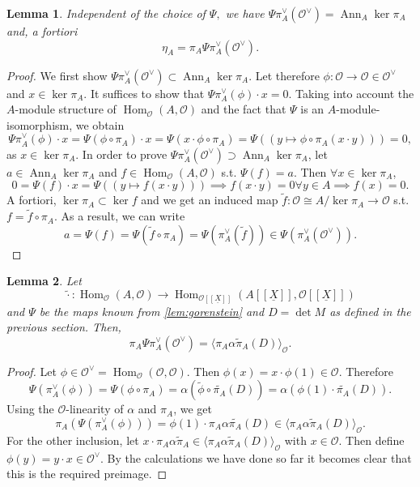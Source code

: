 \documentclass{article}
\theoremstyle{plain}%
\newtheorem{lemma}{Lemma}[section]
\theoremstyle{definition}
\theoremstyle{remark}
\newcommand{\ann}{\operatorname{Ann}}
\renewcommand{\hom}{\operatorname{Hom}}
\begin{document}
\begin{lemma}
    Independent of the choice of \(\Psi,\) we have 
    \(\Psi \pi_A^\vee(\mathcal{O}^\vee) = \ann_A \ker \pi_A\) and, a fortiori
    \[
        \eta_A = \pi_A \Psi \pi_A^\vee(\mathcal{O}^\vee).  
    \]
\end{lemma}
\begin{proof}
    We first show \(\Psi \pi_A^\vee(\mathcal{O}^\vee) \subset \ann_A \ker \pi_A\).
    Let therefore \(\phi\colon \mathcal{O} \to \mathcal{O} \in \mathcal{O}^\vee\) and \(x \in \ker \pi_A\).
    It suffices to show that \(\Psi \pi_A^\vee(\phi) \cdot x = 0\).
    Taking into account the \(A\)-module structure of \(\hom_\mathcal{O}(A, \mathcal{O})\) 
    and the fact that \(\Psi\) is an \(A\)-module-isomorphism, we obtain
    \[
        \Psi \pi_A^\vee(\phi) \cdot x = \Psi(\phi \circ \pi_A) \cdot x = \Psi(x \cdot \phi \circ \pi_A) 
        = \Psi((y \mapsto \phi \circ \pi_A(x\cdot y))) = 0,
    \]
    as \(x \in \ker \pi_A\).
    In order to prove  \(\Psi \pi_A^\vee(\mathcal{O}^\vee) \supset \ann_A \ker \pi_A\), let \(a \in \ann_A \ker \pi_A\)
    and \(f \in \hom_\mathcal{O}(A, \mathcal{O})\) s.t. \(\Psi(f) = a\). Then \(\forall x \in \ker \pi_A\),
    \[
        0 = \Psi(f) \cdot x = \Psi((y \mapsto f(x\cdot y))) \implies f(x\cdot y) = 0 \forall y \in A \implies f(x) = 0.
    \]
    A fortiori, \(\ker \pi_A \subset \ker f\) and we get an induced map \(\tilde f\colon \mathcal{O} \cong A/\ker \pi_A \to \mathcal{O}\)
    s.t. \(f = \tilde f \circ \pi_A\). As a result, we can write
    \[
        a = \Psi(f) = \Psi(\tilde f \circ \pi_A) = \Psi(\pi_A^\vee(\tilde f)) \in \Psi(\pi_A^\vee(\mathcal{O}^\vee)).  
    \]
\end{proof}

\begin{lemma}
    Let 
    \[
        \!\tilde{\cdot}\colon \hom_\mathcal{O}(A, \mathcal{O}) \to 
        \hom_{\mathcal{O}[[\underline{X}]]}(A[[\underline{X}]], \mathcal{O}[[\underline{X}]])
    \]
    and \(\Psi\)
    be the maps known from \cref{lem:gorenstein} and \(D = \det M\) as defined in the previous section.
    Then,
    \[
        \pi_A \Psi \pi_A^\vee(\mathcal{O}^\vee) = \langle\pi_A\alpha \tilde \pi_A(D)\rangle_\mathcal{O}.
    \]
\end{lemma}
\begin{proof}
    Let \(\phi \in \mathcal{O}^\vee = \hom_\mathcal{O}(\mathcal{O}, \mathcal{O})\).
    Then \(\phi(x) = x \cdot\phi(1) \in \mathcal{O}\). Therefore 
    \[
        \Psi(\pi_A^\vee(\phi)) = \Psi(\phi \circ \pi_A) = \alpha(\tilde{\phi} \circ \tilde{\pi_A}(D)) = \alpha(\phi(1)\cdot \tilde{\pi_A}(D)).
    \]
    Using the \(\mathcal{O}\)-linearity of \(\alpha\) and \(\pi_A\), we get
    \[
        \pi_A(\Psi(\pi_A^\vee(\phi))) = \phi(1) \cdot \pi_A \alpha \tilde{\pi_A}(D) \in \langle\pi_A\alpha \tilde \pi_A(D)\rangle_\mathcal{O}.
    \]
    For the other inclusion, let \(x\cdot \pi_A\alpha\tilde \pi_A \in \langle\pi_A\alpha \tilde \pi_A(D)\rangle_\mathcal{O}\) 
    with \(x \in \mathcal{O}\). Then define \(\phi(y) = y \cdot x \in \mathcal{O}^\vee\).
    By the calculations we have done so far it becomes clear that this is the required preimage.
\end{proof}
\end{document}
